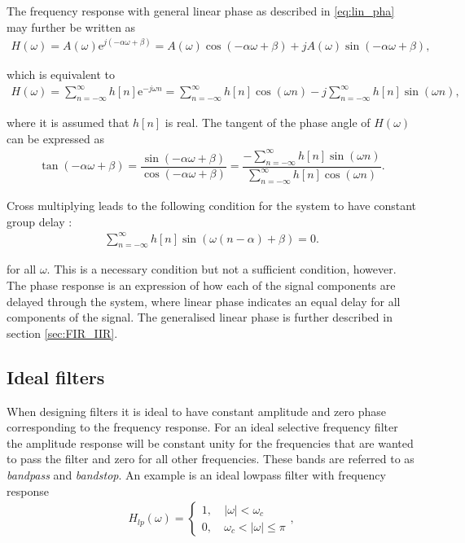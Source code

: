 The frequency response with general linear phase as described in \ref{eq:lin_pha} may further be written as
\begin{align*}
H(\omega) = A(\omega) \text{e}^{j(-\alpha\omega + \beta)} = A(\omega) \cos(-\alpha\omega + \beta) + j A(\omega) \sin(-\alpha\omega + \beta),
\end{align*}

which is equivalent to
\begin{align*}
H(\omega) = \sum_{n=-\infty}^\infty h[n] \text{e}^{-j \omega n} = \sum_{n=-\infty}^\infty h[n] \cos(\omega n) - j \sum_{n=-\infty}^\infty h[n] \sin(\omega n),
\end{align*}

where it is assumed that $h[n]$ is real. The tangent of the phase angle of $H(\omega)$ can be expressed as
\begin{align*}
\tan(-\alpha\omega + \beta) = \dfrac{\sin(-\alpha\omega + \beta)}{\cos(-\alpha\omega + \beta)} = \dfrac{- \sum_{n=-\infty}^\infty h[n] \sin(\omega n)}{\sum_{n=-\infty}^\infty h[n] \cos(\omega n)}.
\end{align*}

Cross multiplying leads to the following condition for the system to have constant group delay \cite{page 341, DTSP}:
\begin{align}\label{eq:cons_gro}
\sum_{n=-\infty}^{\infty}h[n]\sin\left(\omega \left(n-\alpha \right) + \beta \right) = 0.
\end{align}

for all $\omega$. This is a necessary condition but not a sufficient condition, however. The phase response is an expression of how each of the signal components are delayed through the system, where linear phase indicates an equal delay for all components of the signal. The generalised linear phase is further described in section \ref{sec:FIR_IIR}.

\subsection{Ideal filters} \label{sec:ideal_filt}
When designing filters it is ideal to have constant amplitude and zero phase corresponding to the frequency response. For an ideal selective frequency filter the amplitude response will be constant unity for the frequencies that are wanted to pass the filter and zero for all other frequencies. These bands are referred to as \textit{bandpass} and \textit{bandstop}. An example is an ideal lowpass filter with frequency response 
\begin{align} \label{eq:low}
H_{lp}(\omega) =
\left\{ \begin{matrix}
1, &\ \left| \omega \right|< \omega_c \\
0, &\ \omega_c < \left| \omega \right| \leq \pi
\end{matrix}\right.,
\end{align}
    
